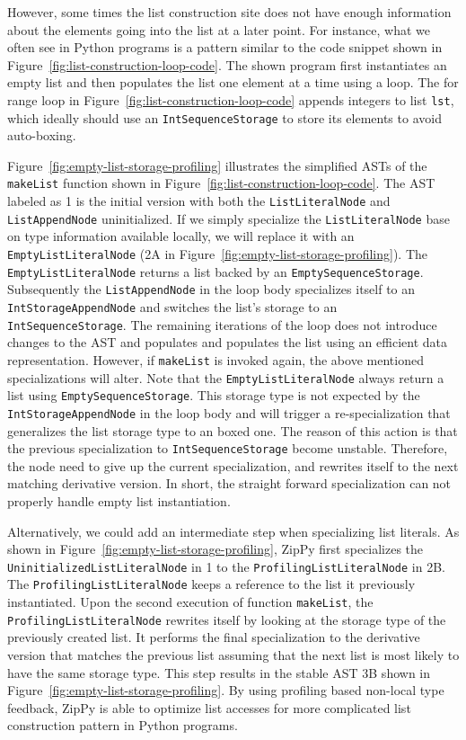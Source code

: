 However, some times the list construction site does not have enough information about the elements going into the list at a later point.
For instance, what we often see in Python programs is a pattern similar to the code snippet shown in Figure~\ref{fig:list-construction-loop-code}.
The shown program first instantiates an empty list and then populates the list one element at a time using a loop.
The for range loop in Figure~\ref{fig:list-construction-loop-code} appends integers to list \texttt{lst},
which ideally should use an \texttt{IntSequenceStorage} to store its elements to avoid auto-boxing.

Figure~\ref{fig:empty-list-storage-profiling} illustrates the simplified ASTs of the \texttt{makeList} function shown in Figure~\ref{fig:list-construction-loop-code}.
The AST labeled as \textsf{1} is the initial version with both the \texttt{ListLiteralNode} and \texttt{ListAppendNode} uninitialized.
If we simply specialize the \texttt{ListLiteralNode} base on type information available locally, we will replace it with an \texttt{EmptyListLiteralNode} (\textsf{2A} in Figure~\ref{fig:empty-list-storage-profiling}).
The \texttt{EmptyListLiteralNode} returns a list backed by an \texttt{EmptySequenceStorage}.
Subsequently the \texttt{ListAppendNode} in the loop body specializes itself to an \texttt{IntStorageAppendNode} and switches the list's storage to an \texttt{IntSequenceStorage}.
The remaining iterations of the loop does not introduce changes to the AST and populates and populates the list using an efficient data representation.
However, if \texttt{makeList} is invoked again, the above mentioned specializations will alter.
Note that the \texttt{EmptyListLiteralNode} always return a list using \texttt{EmptySequenceStorage}.
This storage type is not expected by the \texttt{IntStorageAppendNode} in the loop body and will trigger a re-specialization that generalizes the list storage type to an boxed one.
The reason of this action is that the previous specialization to \texttt{IntSequenceStorage} become unstable.
Therefore, the node need to give up the current specialization, and rewrites itself to the next matching derivative version.
In short, the straight forward specialization can not properly handle empty list instantiation.

Alternatively, we could add an intermediate step when specializing list literals.
As shown in Figure~\ref{fig:empty-list-storage-profiling}, ZipPy first specializes the \texttt{UninitializedListLiteralNode} in \textsf{1} to the \texttt{Profili\-ngListLiteralNode} in \textsf{2B}.
The \texttt{ProfilingListLiteralNode} keeps a reference to the list it previously instantiated.
Upon the second execution of function \texttt{makeList}, the \texttt{ProfilingLis\-tLiteralNode} rewrites itself by looking at the storage type of the previously created list.
It performs the final specialization to the derivative version that matches the previous list assuming that the next list is most likely to have the same storage type.
This step results in the stable AST \textsf{3B} shown in Figure~\ref{fig:empty-list-storage-profiling}.
By using profiling based non-local type feedback, ZipPy is able to optimize list accesses for more complicated list construction pattern in Python programs.

